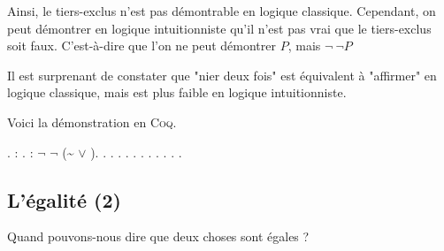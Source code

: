 Ainsi, le tiers-exclus n'est pas démontrable en logique classique. Cependant, on peut
démontrer en logique intuitionniste qu'il n'est pas vrai que le tiers-exclus soit faux.
C'est-à-dire que l'on ne peut démontrer $P$, mais $\lnot\ \lnot P$

Il est surprenant de constater que "nier deux fois" est équivalent à "affirmer" en logique classique, mais est plus
faible en logique intuitionniste.

Voici la démonstration en \textsc{Coq}.

\begin{coqdoccode}
\coqdocnoindent
{} .\coqdoceol
\coqdocnoindent
{}  : .\coqdoceol
\coqdocemptyline
\coqdocnoindent
{} : \ensuremath{\lnot} \ensuremath{\lnot} (\~{} \ensuremath{\lor} ).\coqdoceol
\coqdocnoindent
{}.\coqdoceol
\coqdocindent{1.00em}
 .\coqdoceol
\coqdocindent{1.00em}
 .\coqdoceol
\coqdocindent{1.00em}
 .\coqdoceol
\coqdocindent{1.00em}
.\coqdoceol
\coqdocindent{1.00em}
 .\coqdoceol
\coqdocemptyline
\coqdocindent{1.00em}
 .\coqdoceol
\coqdocindent{1.00em}
.\coqdoceol
\coqdocindent{1.00em}
.\coqdoceol
\coqdocnoindent
{}.\coqdoceol
\coqdocemptyline
\coqdocnoindent
{} .\coqdoceol
\end{coqdoccode}

\subsection{L'égalité (2)}
Quand pouvons-nous dire que deux choses sont égales ?

